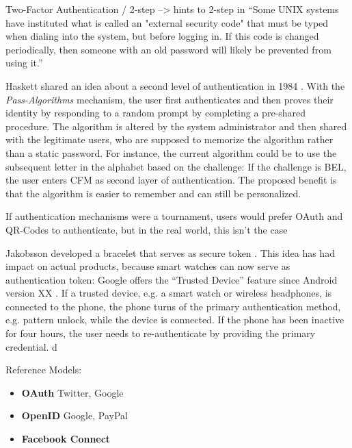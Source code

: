 Two-Factor Authentication / 2-step --> hints to 2-step in ``Some UNIX systems have instituted what is called an "external security code" that must be typed when dialing into the system, but before logging in. If this code is changed periodically, then someone with an old password will likely be prevented from using it.'' \cite{Morris1979PasswordSecurity}

Haskett shared an idea about a second level of authentication in 1984 \cite{Haskett1984PassAlgorithms}. With the \textit{Pass-Algorithms} mechanism, the user first authenticates and then proves their identity by responding to a random prompt by completing a pre-shared procedure. The algorithm is altered by the system administrator and then shared with the legitimate users, who are supposed to memorize the algorithm rather than a static password. For instance, the current algorithm could be to use the subsequent letter in the alphabet based on the challenge: If the challenge is BEL, the user enters CFM as second layer of authentication. The proposed benefit is that the algorithm is easier to remember and can still be personalized. 

If authentication mechanisms were a tournament, users would prefer OAuth and QR-Codes to authenticate, but in the real world, this isn't the case \cite{Ruoti2015AuthenticationMelee}

	Jakobsson developed a bracelet that serves as secure token \cite{Jakobsson2014HowToWearYourPW}. This idea has had impact on actual products, because smart watches can now serve as authentication token: Google offers the ``Trusted Device'' feature since Android version XX . If a trusted device, e.g. a smart watch or wireless headphones, is connected to the phone, the phone turns of the primary authentication method, e.g. pattern unlock, while the device is connected. If the phone has been inactive for four hours, the user needs to re-authenticate by providing the primary credential. d

Reference Models:
\cite{Egelman2013ProfilePassword,Sun2010BillionKeys}

\begin{itemize}
\item \textbf{OAuth} Twitter, Google
\item \textbf{OpenID} Google, PayPal
\item \textbf{Facebook Connect} 
\end{itemize}

